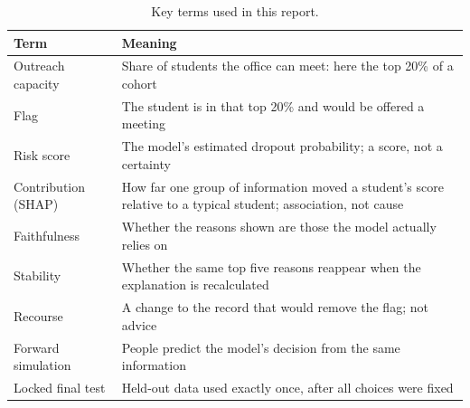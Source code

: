 \begin{table}[!htb]
\centering
\caption{Key terms used in this report.}
\label{tab:terms}
\footnotesize
\setlength{\tabcolsep}{3pt}
\begin{tabular}{@{}>{\raggedright\arraybackslash}p{2.0cm}p{6.0cm}@{}}
\toprule
\textbf{Term} & \textbf{Meaning} \\
\midrule
Outreach capacity & Share of students the office can meet: here the top 20\% of a cohort \\
Flag & The student is in that top 20\% and would be offered a meeting \\
Risk score & The model's estimated dropout probability; a score, not a certainty \\
Contribution (SHAP) & How far one group of information moved a student's score relative to a typical student; association, not cause \\
Faithfulness & Whether the reasons shown are those the model actually relies on \\
Stability & Whether the same top five reasons reappear when the explanation is recalculated \\
Recourse & A change to the record that would remove the flag; not advice \\
Forward simulation & People predict the model's decision from the same information \\
Locked final test & Held-out data used exactly once, after all choices were fixed \\
\bottomrule
\end{tabular}
\end{table}
